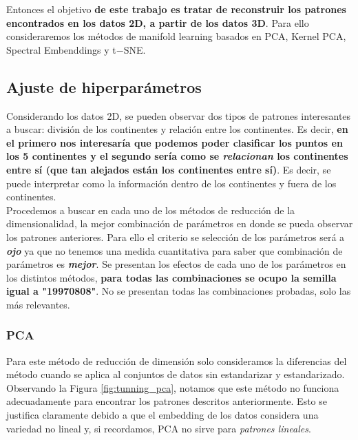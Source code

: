 \documentclass[paper=letter, fontsize=11pt]{scrartcl}
\numberwithin{equation}{section} %
\numberwithin{figure}{section} %
\numberwithin{table}{section} %
\begin{document}
Entonces el objetivo \textbf{de este trabajo es tratar de reconstruir los patrones encontrados en los datos 2D, a partir de los datos 3D}. Para ello consideraremos los métodos de manifold learning basados en PCA, Kernel PCA, Spectral Embenddings y t$-$SNE. 

\subsection{Ajuste de hiperparámetros}
Considerando los datos 2D, se pueden observar dos tipos de patrones interesantes a buscar: división de los continentes y relación entre los continentes. Es decir, \textbf{en el primero nos interesaría que podemos poder clasificar los puntos en los 5 continentes y el segundo sería como se \textit{relacionan} los continentes entre sí (que tan alejados están los continentes entre sí)}. Es decir, se puede interpretar como la información dentro de los continentes y fuera de los continentes. \\

Procedemos a buscar en cada uno de los métodos de reducción de la dimensionalidad, la mejor combinación de parámetros en donde se pueda observar los patrones anteriores. Para ello el criterio se selección de los parámetros será a \textbf{\textit{ojo}} ya que no tenemos una medida cuantitativa para saber que combinación de parámetros es \textbf{\textit{mejor}}. Se presentan los efectos de cada uno de los parámetros en los distintos métodos, \textbf{para todas las combinaciones se ocupo la semilla igual a "19970808"}. No se presentan todas las combinaciones probadas, solo las más relevantes. 

\subsubsection*{PCA}
Para este método de reducción de dimensión solo consideramos la diferencias del método cuando se aplica al conjuntos de datos sin estandarizar y estandarizado. \\

Observando la Figura \ref{fig:tunning_pca}, notamos que este método no funciona adecuadamente para encontrar los patrones descritos anteriormente. Esto se justifica claramente debido a que el embedding de los datos considera una variedad no lineal y, si recordamos, PCA no sirve para \textit{patrones lineales}. 
\end{document}
